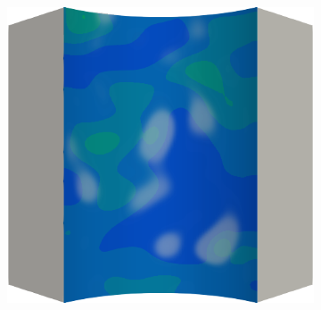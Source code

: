 \begin{figure}[!htbp]
\begin{subfigure}{0.19\textwidth}
  \end{subfigure}
  \hspace{0.06\textwidth}
  \begin{subfigure}{0.19\textwidth}
    \centering
    \includegraphics[width=\textwidth]{Chapter5/figures/spallation/ep.0006}
  \end{subfigure}
  

\end{figure}
